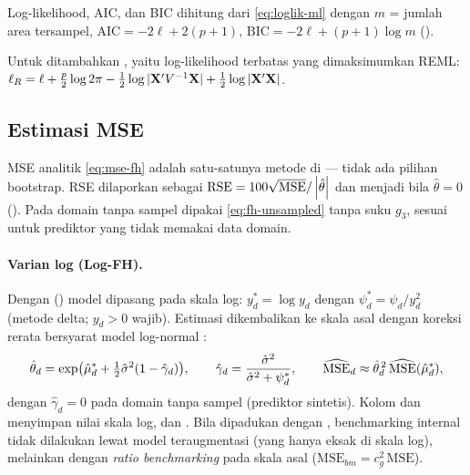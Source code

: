 Log-likelihood, AIC, dan BIC dihitung dari \eqref{eq:loglik-ml} dengan $m$
= jumlah area tersampel, $\mathrm{AIC}=-2\ell+2(p+1)$,
$\mathrm{BIC}=-2\ell+(p+1)\log m$ ().

Untuk  ditambahkan , yaitu
log-likelihood terbatas yang dimaksimumkan REML:
$\ell_R=\ell+\tfrac p2\log2\pi-\tfrac12\log|\mathbf{X}'V^{-1}\mathbf{X}|+\tfrac12\log|\mathbf{X}'\mathbf{X}|$.


\subsection{Estimasi MSE}\label{sec:fh-mse}

MSE analitik \eqref{eq:mse-fh} adalah satu-satunya metode di  --- tidak
ada pilihan bootstrap. RSE dilaporkan sebagai
$\mathrm{RSE}=100\sqrt{\mathrm{MSE}}/\left|\hat\theta\right|$ dan menjadi
 bila $\hat\theta=0$ (). Pada domain tanpa
sampel dipakai \eqref{eq:fh-unsampled} tanpa suku $g_3$, sesuai
\citet{prasad1990estimation} untuk prediktor yang tidak memakai data domain.

\paragraph{Varian log (Log-FH).} Dengan 
() model dipasang pada skala log:
$y_d^\ast=\log y_d$ dengan $\psi_d^\ast=\psi_d/y_d^2$ (metode delta; $y_d>0$
wajib). Estimasi dikembalikan ke skala asal dengan koreksi rerata bersyarat
model log-normal \citep[tanpa suku $O(m^{-1})$ dari][]{slud2006mean}:
\begin{equation}
  \hat\theta_d=\exp\bigl(\hat\mu_d^\ast+\tfrac12\hat\sigma^2(1-\hat\gamma_d)\bigr),
  \qquad \hat\gamma_d=\frac{\hat\sigma^2}{\hat\sigma^2+\psi_d^\ast},
  \qquad \widehat{\mathrm{MSE}}_d\approx\hat\theta_d^{\,2}\,\widehat{\mathrm{MSE}}(\hat\mu_d^\ast),
  \label{eq:fh-log}
\end{equation}
dengan $\hat\gamma_d=0$ pada domain tanpa sampel (prediktor sintetis).
Kolom  dan  menyimpan nilai skala log, dan
. Bila dipadukan dengan ,
benchmarking internal tidak dilakukan lewat model teraugmentasi (yang hanya
eksak di skala log), melainkan dengan \emph{ratio benchmarking} pada skala asal
($\mathrm{MSE}_{bm}=c_g^2\,\mathrm{MSE}$).

